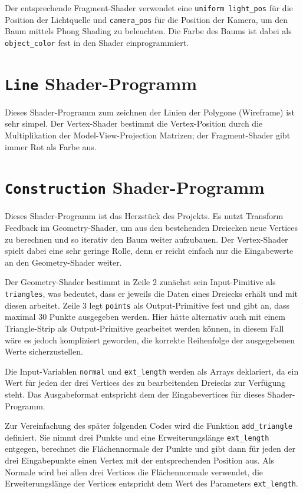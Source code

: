 Der entsprechende Fragment-Shader verwendet eine \lstinline{uniform light_pos} für die Position der Lichtquelle und \lstinline{camera_pos} für die Position der Kamera, um den Baum mittels Phong Shading zu beleuchten. Die Farbe des Baums ist dabei als \lstinline{object_color} fest in den Shader einprogrammiert.

\section{\lstinline{Line} Shader-Programm}
Dieses Shader-Programm zum zeichnen der Linien der Polygone (Wireframe) ist sehr simpel. Der Vertex-Shader bestimmt die Vertex-Position durch die Multiplikation der Model-View-Projection Matrizen; der Fragment-Shader gibt immer Rot als Farbe aus.

\section{\lstinline{Construction} Shader-Programm}
Dieses Shader-Programm ist das Herzstück des Projekts. Es nutzt Transform Feedback im Geometry-Shader, um aus den bestehenden Dreiecken neue Vertices zu berechnen und so iterativ den Baum weiter aufzubauen. Der Vertex-Shader spielt dabei eine sehr geringe Rolle, denn er reicht einfach nur die Eingabewerte an den Geometry-Shader weiter.

Der Geometry-Shader bestimmt in Zeile 2 zunächst sein Input-Pimitive als \lstinline{triangles}, was bedeutet, dass er jeweils die Daten eines Dreiecks erhält und mit diesen arbeitet. Zeile 3 legt \lstinline{points} als Output-Primitive fest und gibt an, dass maximal 30 Punkte ausgegeben werden. Hier hätte alternativ auch mit einem Triangle-Strip als Output-Primitive gearbeitet werden können, in diesem Fall wäre es jedoch kompliziert geworden, die korrekte Reihenfolge der ausgegebenen Werte sicherzustellen.

Die Input-Variablen \lstinline{normal} und \lstinline{ext_length} werden als Arrays deklariert, da ein Wert für jeden der drei Vertices des zu bearbeitenden Dreiecks zur Verfügung steht. Das Ausgabeformat entspricht dem der Eingabevertices für dieses Shader-Programm. 

Zur Vereinfachung des später folgenden Codes wird die Funktion \lstinline{add_triangle} definiert. Sie nimmt drei Punkte und eine Erweiterungslänge \lstinline{ext_length} entgegen, berechnet die Flächennormale der Punkte und gibt dann für jeden der drei Eingabepunkte einen Vertex mit der entsprechenden Position aus. Als Normale wird bei allen drei Vertices die Flächennormale verwendet, die Erweiterungslänge der Vertices entspricht dem Wert des Parameters \lstinline{ext_length}.

